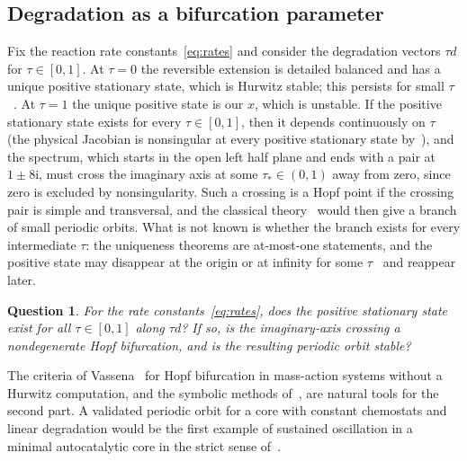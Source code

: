 \documentclass[11pt,a4paper]{article}
\theoremstyle{plain}
\newtheorem{question}[theorem]{Question}
\theoremstyle{definition}
\theoremstyle{remark}
\numberwithin{equation}{section}
\newcommand{\iu}{\mathrm{i}}
\begin{document}
\subsection*{Degradation as a bifurcation parameter}
Fix the reaction rate constants~\eqref{eq:rates} and consider the degradation vectors $\tau d$ for $\tau\in[0,1]$. At $\tau=0$ the reversible extension is detailed balanced and has a unique positive stationary state, which is Hurwitz stable; this persists for small $\tau$~\cite[Proposition~8.4]{TypeIImixed}. At $\tau=1$ the unique positive state is our $x$, which is unstable. If the positive stationary state exists for every $\tau\in[0,1]$, then it depends continuously on $\tau$ (the physical Jacobian is nonsingular at every positive stationary state by~\cite[Theorem~6.5 and Remark~8.3]{TypeIImixed}), and the spectrum, which starts in the open left half plane and ends with a pair at $1\pm8\iu$, must cross the imaginary axis at some $\tau_*\in(0,1)$ away from zero, since zero is excluded by nonsingularity. Such a crossing is a Hopf point if the crossing pair is simple and transversal, and the classical theory~\cite{Kuznetsov2004} would then give a branch of small periodic orbits. What is not known is whether the branch exists for every intermediate $\tau$: the uniqueness theorems are at-most-one statements, and the positive state may disappear at the origin or at infinity for some $\tau$~\cite[Proposition~8.5]{TypeIImixed} and reappear later.

\begin{question}\label{q:hopf}
For the rate constants~\eqref{eq:rates}, does the positive stationary state exist for all $\tau\in[0,1]$ along $\tau d$? If so, is the imaginary-axis crossing a nondegenerate Hopf bifurcation, and is the resulting periodic orbit stable?
\end{question}

The criteria of Vassena~\cite{Vassena2025Hopf} for Hopf bifurcation in mass-action systems without a Hurwitz computation, and the symbolic methods of~\cite{Vassena2024Symbolic}, are natural tools for the second part. A validated periodic orbit for a core with constant chemostats and linear degradation would be the first example of sustained oscillation in a minimal autocatalytic core in the strict sense of~\cite{NNU26}.
\end{document}
